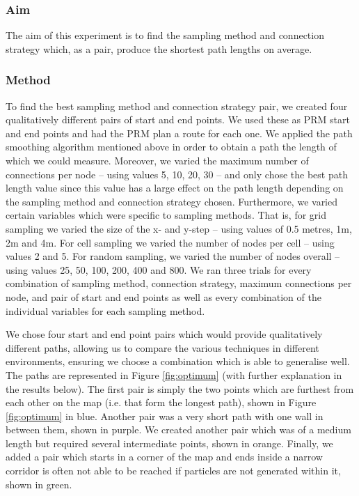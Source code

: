 \documentclass[conference]{IEEEtran}
\begin{document}
\subsubsection{Aim}
The aim of this experiment is to find the sampling method and connection strategy which, as a pair, produce the shortest path lengths on average.
\subsubsection{Method}
To find the best sampling method and connection strategy pair, we created four qualitatively different pairs of start and end points. We used these as PRM start and end points and had the PRM plan a route for each one. We applied the path smoothing algorithm mentioned above in order to obtain a path the length of which we could measure. Moreover, we varied the maximum number of connections per node -- using values 5, 10, 20, 30 -- and only chose the best path length value since this value has a large effect on the path length depending on the sampling method and connection strategy chosen. Furthermore, we varied certain variables which were specific to sampling methods. That is, for grid sampling we varied the size of the x- and y-step -- using values of 0.5 metres, 1m, 2m and 4m. For cell sampling we varied the number of nodes per cell -- using values 2 and 5. For random sampling, we varied the number of nodes overall -- using values 25, 50, 100, 200, 400 and 800. We ran three trials for every combination of sampling method, connection strategy, maximum connections per node, and pair of start and end points as well as every combination of the individual variables for each sampling method.

We chose four start and end point pairs which would provide qualitatively different paths, allowing us to compare the various techniques in different environments, ensuring we choose a combination which is able to generalise well. The paths are represented in Figure \ref{fig:optimum} (with further explanation in the results below). The first pair is simply the two points which are furthest from each other on the map (i.e. that form the longest path), shown in Figure \ref{fig:optimum} in blue. Another pair was a very short path with one wall in between them, shown in purple. We created another pair which was of a medium length but required several intermediate points, shown in orange. Finally, we added a pair which starts in a corner of the map and ends inside a narrow corridor is often not able to be reached if particles are not generated within it, shown in green.
\end{document}
